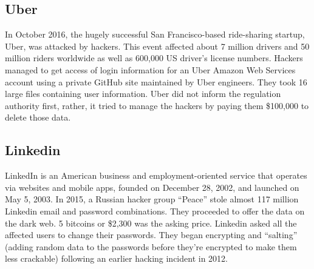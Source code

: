 \documentclass[12pt,a4paper,conference]{IEEEtran}
\begin{document}
\subsection{Uber}
In October 2016, the hugely successful San Francisco-based ride-sharing startup, Uber, was attacked by hackers. This event affected about 7 million drivers and 50 million riders worldwide as well as 600,000 US driver’s license numbers. Hackers managed to get access of login information for an Uber Amazon Web Services account using a private GitHub site maintained by Uber engineers. They took 16 large files containing user information. Uber did not inform the regulation authority first, rather, it tried to manage the hackers by paying them \$100,000 to delete those data. 

\subsection{Linkedin}
LinkedIn is an American business and employment-oriented service that operates via websites and mobile apps, founded on December 28, 2002, and launched on May 5, 2003. In 2015, a Russian hacker group “Peace” stole almost 117 million Linkedin email and password combinations. They proceeded to offer the data on the dark web. 5 bitcoins or \$2,300 was the asking price. Linkedin asked all the affected users to change their passwords. They began encrypting and “salting” (adding random data to the passwords before they’re encrypted to make them less crackable) following an earlier hacking incident in 2012. \autocite{Breaches18}
\end{document}
